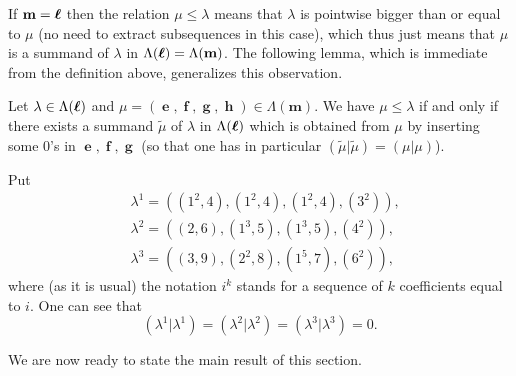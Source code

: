 \documentclass[12pt,reqno]{amsart}
\begin{document}
If $\mathbf{m}=\boldsymbol{\ell}$ then the relation $\mu\leq\lambda$ means that $\lambda$ is pointwise bigger than or equal to $\mu$ (no need to extract subsequences in this case), which thus just means that $\mu$ is a summand of $\lambda$ in $\Lambda(\boldsymbol{\ell})=\Lambda(\mathbf{m})$.
The following lemma, which is immediate from the definition above, generalizes this observation.

\begin{lemma}\label{L-summand}
\newcommand{\bfemm}{\boldsymbol{m}}
Let $\lambda\in\Lambda(\boldsymbol{\ell})$
and $\mu=(\mbfe,\mbff,\mbfg,\mbfh)\in\Lambda(\bfemm)$.
We have $\mu\leq \lambda$ if and only if there exists a summand $\tilde\mu$ of $\lambda$ in $\Lambda(\boldsymbol{\ell})$
which is obtained from $\mu$ by inserting some $0$'s in $\mbfe,\mbff,\mbfg$
(so that one has in particular $(\tilde\mu|\tilde\mu)=(\mu|\mu)$).
\end{lemma}

Put
\begin{eqnarray*}
 & \lambda^1=((1^2,4),(1^2,4),(1^2,4),(3^2)), \\
 & \lambda^2=((2,6),(1^3,5),(1^3,5),(4^2)), \\
 & \lambda^3=((3,9),(2^2,8),(1^5,7),(6^2)),
\end{eqnarray*}
where (as it is usual) the notation $i^k$ stands for a sequence of $k$ coefficients equal to $i$.
One can see that
\begin{equation}
\label{Tits-form-lambda-i}
(\lambda^1|\lambda^1)=(\lambda^2|\lambda^2)=(\lambda^3|\lambda^3)=0.
\end{equation}

We are now ready to state the main result of this section.
\end{document}
